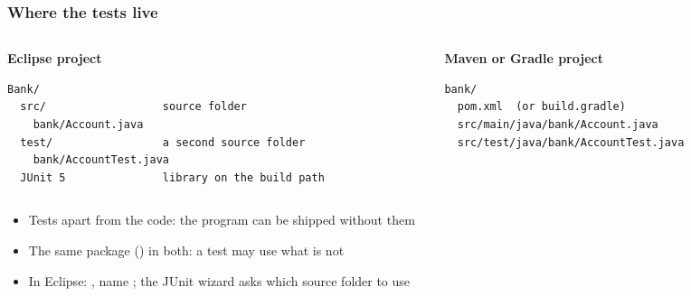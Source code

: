 \documentclass[aspectratio=169,10pt,compress]{beamer}
\begin{document}
\begin{frame}[t,fragile] \frametitle{Where the tests live}
	\begin{columns}[T]
		\begin{column}{0.48\textwidth}
			\small \textbf{Eclipse project}


\begin{lstlisting}[style=codesnippet, language={}, basicstyle=\ttfamily\scriptsize]
Bank/
  src/                  source folder
    bank/Account.java
  test/                 a second source folder
    bank/AccountTest.java
  JUnit 5               library on the build path
\end{lstlisting}


		\end{column}
		\begin{column}{0.48\textwidth}
			\small \textbf{Maven or Gradle project}


\begin{lstlisting}[style=codesnippet, language={}, basicstyle=\ttfamily\scriptsize]
bank/
  pom.xml  (or build.gradle)
  src/main/java/bank/Account.java
  src/test/java/bank/AccountTest.java
\end{lstlisting}


		\end{column}
	\end{columns}

	\vspace{0.5em}
	\begin{itemize}\small
		\item Tests apart from the code: the program can be shipped without them
		\item The same package () in both: a test may use what is not 
		\item In Eclipse: , name ; the JUnit wizard asks which source folder to use
	\end{itemize}
\end{frame}
\end{document}
